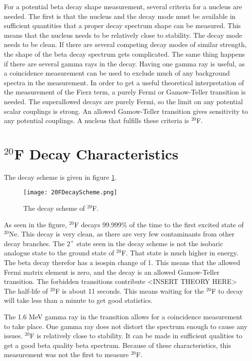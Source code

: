\documentclass[main.tex]{subfiles}
\begin{document}
For a potential beta decay shape measurement, several criteria for a nucleus are needed.
The first is that the nucleus and the decay mode must be available in sufficient quantities that a proper decay spectrum shape can be measured.
This means that the nucleus needs to be relatively close to stability.
The decay mode needs to be clean.
If there are several competing decay modes of similar strength, the shape of the beta decay spectrum gets complicated.
The same thing happens if there are several gamma rays in the decay. 
Having one gamma ray is useful, as a coincidence measurement can be used to exclude much of any background spectra in the measurement.
In order to get a useful theoretical interpretation of the measurement of the Fierz term, a purely Fermi or Gamow-Teller transition is needed.
The superallowed decays are purely Fermi, so the limit on any potential scalar couplings is strong.
An allowed Gamow-Teller transition gives sensitivity to any potential couplings. 
A nucleus that fulfills these criteria is $^{20}$F. 
 
\section{$^{20}$F Decay Characteristics}
The decay scheme is given in figure \ref{fig:DecayScheme}.

\begin{figure}[!htb]
	\centerline{\texttt{[image: 20FDecayScheme.png]}}
	\caption{The decay scheme of $^{20}$F.}
	\label{fig:DecayScheme}
\end{figure}

As seen in the figure, $^{20}$F decays 99.999\% of the time to the first excited state of $^{20}$Ne.
This decay is very clean, as there are very few contaminants from other decay branches. 
The $2^{+}$ state seen in the decay scheme is not the isobaric analogue state to the ground state of $^{20}$F.
That state is much higher in energy.
The beta decay therefor has a isospin change of 1.
This means that the allowed Fermi matrix element is zero, and the decay is an allowed Gamow-Teller transition. 
The forbidden transitions contribute <INSERT THEORY HERE> 
The half-life of $^{20}$F is about 11 seconds. 
This means waiting for the $^{20}$F to decay will take less than a minute to get good statistics.

The 1.6 MeV gamma ray in the transition allows for a coincidence measurement to take place.
One gamma ray does not distort the spectrum enough to cause any issues.
$^{20}$F is relatively close to stability. 
It can be made in sufficient qualities to get a good beta quality beta spectrum.
Because of these characteristics, this measurement was not the first to measure $^{20}$F.
\end{document}

